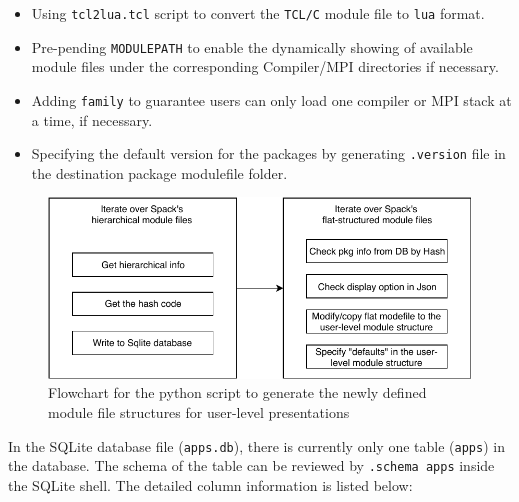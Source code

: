 \documentclass[conference]{IEEEtran}
\begin{document}
\begin{itemize}
    \item Using \texttt{tcl2lua.tcl} script to convert the \texttt{TCL/C} module file to \texttt{lua} format.
    \item Pre-pending \texttt{MODULEPATH} to enable the dynamically showing of available module files under the corresponding Compiler/MPI directories if necessary.
    \item Adding \texttt{family} to guarantee users can only load one compiler or MPI stack at a time, if necessary.
    \item Specifying the default version for the packages by generating \texttt{.version} file in the destination package modulefile folder.
\end{itemize}

\begin{figure}[htbp]
  \centerline{\includegraphics[width=\linewidth]{figures/modulefilter_flowchart}}
  \caption{Flowchart for the python script to generate the newly defined module file structures for user-level presentations}
  \label{fig:modulefilter_flowchart}
\end{figure}

In the SQLite database file (\verb|apps.db|), there is currently only one table (\verb|apps|) in the database. The schema of the table can be reviewed by \verb|.schema apps| inside the SQLite shell. The detailed column information is listed below:
\end{document}
